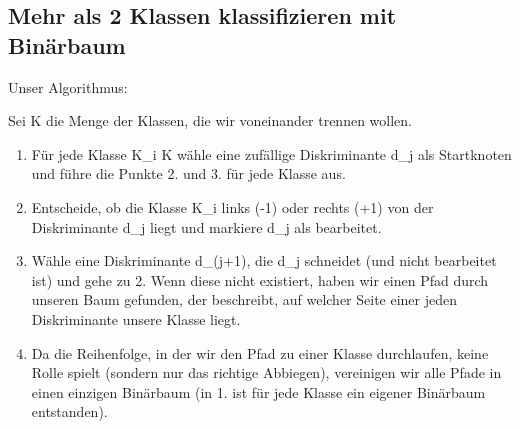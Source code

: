 \documentclass[12pt]{article}
\begin{document}
\newpage

\subsection{Mehr als 2 Klassen klassifizieren mit Bin\"arbaum}

Unser Algorithmus:

Sei K die Menge der Klassen, die wir voneinander trennen wollen.

\begin{enumerate}
\item Für jede Klasse K\_i \in K wähle eine zufällige Diskriminante d\_j als Startknoten und führe die Punkte 2. und 3. für jede Klasse aus.
\item Entscheide, ob die Klasse K\_i links (-1) oder rechts (+1) von der Diskriminante d\_j liegt und markiere d\_j als bearbeitet.
\item Wähle eine Diskriminante d_(j+1), die d\_j schneidet (und nicht bearbeitet ist) und gehe zu 2. Wenn diese nicht existiert, haben wir einen Pfad durch unseren Baum gefunden, der beschreibt, auf welcher Seite einer jeden Diskriminante unsere Klasse liegt.
\item Da die Reihenfolge, in der wir den Pfad zu einer Klasse durchlaufen, keine Rolle spielt (sondern nur das richtige Abbiegen), vereinigen wir alle Pfade in einen einzigen Binärbaum (in 1. ist für jede Klasse ein eigener Binärbaum entstanden).
\end{enumerate}
\end{document}
